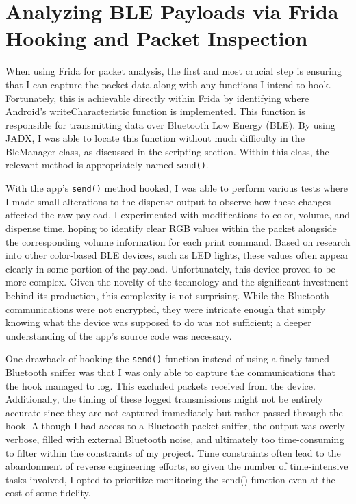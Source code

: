 \section{Analyzing BLE Payloads via Frida Hooking and Packet Inspection}
When using Frida for packet analysis, the first and most crucial step is ensuring that I can capture the packet data along with any functions I intend to hook. Fortunately, this is achievable directly within Frida by identifying where Android’s writeCharacteristic function is implemented. This function is responsible for transmitting data over Bluetooth Low Energy (BLE). By using JADX, I was able to locate this function without much difficulty in the BleManager class, as discussed in the scripting section. Within this class, the relevant method is appropriately named \texttt{send()}.

With the app’s \texttt{send()} method hooked, I was able to perform various tests where I made small alterations to the dispense output to observe how these changes affected the raw payload. I experimented with modifications to color, volume, and dispense time, hoping to identify clear RGB values within the packet alongside the corresponding volume information for each print command. Based on research into other color-based BLE devices, such as LED lights, these values often appear clearly in some portion of the payload.
Unfortunately, this device proved to be more complex. Given the novelty of the technology and the significant investment behind its production, this complexity is not surprising. While the Bluetooth communications were not encrypted, they were intricate enough that simply knowing what the device was supposed to do was not sufficient; a deeper understanding of the app’s source code was necessary.

One drawback of hooking the \texttt{send()} function instead of using a finely tuned Bluetooth sniffer was that I was only able to capture the communications that the hook managed to log. This excluded packets received from the device. Additionally, the timing of these logged transmissions might not be entirely accurate since they are not captured immediately but rather passed through the hook. Although I had access to a Bluetooth packet sniffer, the output was overly verbose, filled with external Bluetooth noise, and ultimately too time-consuming to filter within the constraints of my project. Time constraints often lead to the abandonment of reverse engineering efforts, so given the number of time-intensive tasks involved, I opted to prioritize monitoring the send() function even at the cost of some fidelity.

